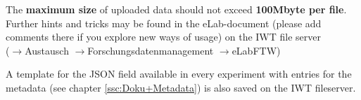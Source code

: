 The \textbf{maximum size} of uploaded data should not exceed
\textbf{100Mbyte per file}. Further hints and tricks may be found in the eLab-document (please add comments there if you explore new ways of usage) on the IWT file server   \\ ($\rightarrow$Austausch $\rightarrow$Forschungsdatenmanagement $\rightarrow$eLabFTW)

A template for the JSON field available in every experiment with entries for the metadata (see chapter \ref{ssc:Doku+Metadata}) is also saved on the IWT fileserver.

